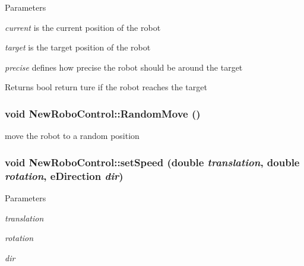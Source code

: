 \begin{DoxyParams}{Parameters}
\item[{\em current}]is the current position of the robot \item[{\em target}]is the target position of the robot \item[{\em precise}]defines how precise the robot should be around the target \end{DoxyParams}
\begin{DoxyReturn}{Returns}
bool return ture if the robot reaches the target 
\end{DoxyReturn}
\hypertarget{classNewRoboControl_ab3231acd7efd60677b4f48b094cb6dd3}{
\subsubsection[{RandomMove}]{\setlength{\rightskip}{0pt plus 5cm}void NewRoboControl::RandomMove ()}}
\label{classNewRoboControl_ab3231acd7efd60677b4f48b094cb6dd3}


move the robot to a random position 

\hypertarget{classNewRoboControl_ad2ddddb5f0272a733021524ebaaaeffd}{
\subsubsection[{setSpeed}]{\setlength{\rightskip}{0pt plus 5cm}void NewRoboControl::setSpeed (double {\em translation}, \/  double {\em rotation}, \/  {\bf eDirection} {\em dir})}}
\label{classNewRoboControl_ad2ddddb5f0272a733021524ebaaaeffd}

\begin{DoxyParams}{Parameters}
\item[{\em translation}]\item[{\em rotation}]\item[{\em dir}]\end{DoxyParams}


